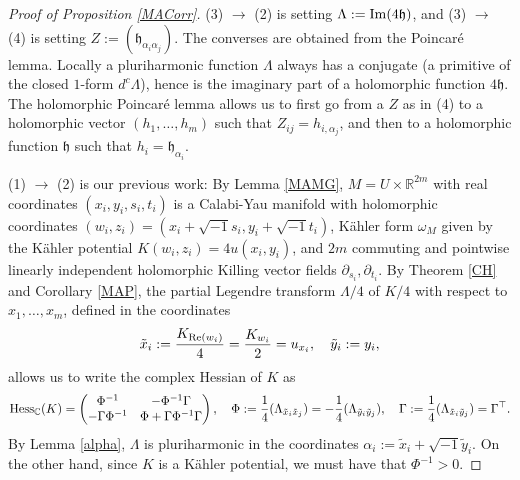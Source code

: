 \documentclass[11pt,reqno]{amsart}
\newcommand{\C}{\mathbb{C}}
\newcommand{\R}{\mathbb{R}}
\theoremstyle{plain}
\theoremstyle{definition}
\numberwithin{equation}{section}
\begin{document}
\begin{proof}[Proof of Proposition \ref{MACorr}]
    (3) $\longrightarrow$ (2) is setting $\Lambda := {\rm Im}(4\mathfrak{h})$, and (3) $\longrightarrow$ (4) is setting $Z := (\mathfrak{h}_{\alpha_i \alpha_j})$. The converses are obtained from the Poincaré lemma. Locally a pluriharmonic function $\Lambda$ always has a conjugate (a primitive of the closed $1$-form $d^c\Lambda$), hence is the imaginary part of a holomorphic function $4\mathfrak{h}$. The holomorphic Poincaré lemma allows us to first go from a $Z$ as in (4) to a holomorphic vector $(h_1,\ldots, h_m)$ such that $Z_{ij} = h_{i,\alpha_j}$, and then to a holomorphic function $\mathfrak{h}$ such that $h_i = \mathfrak{h}_{\alpha_i}$. 

    (1) $\longrightarrow$ (2) is our previous work: By Lemma \ref{MAMG}, $M=U\times \R^{2m}$ with real coordinates $(x_{i},y_{i},s_{i},t_{i})$ is a Calabi-Yau manifold with holomorphic coordinates $(w_{i},z_{i})=(x_{i}+\sqrt{-1}s_{i},y_{i}+\sqrt{-1}t_{i})$, Kähler form $\omega_M$ given by the Kähler potential $K(w_{i},z_{i})=4u(x_{i},y_{i})$, and $2m$ commuting and pointwise linearly independent holomorphic Killing vector fields $\partial_{s_i}, \partial_{t_i}$. By Theorem \ref{CH} and Corollary \ref{MAP}, the partial Legendre transform $\Lambda/4$ of $K/4$ with respect to $x_1,\ldots,x_m$, defined in the coordinates
$$\tilde{x}_{i}:=\frac{K_{{\rm Re}(w_i)}}{4} = \frac{K_{w_{i}}}{2}=u_{x_{i}} ,\quad  \tilde{y}_{i}:=y_{i},$$
allows us to write the complex Hessian of $K$ as
$${\rm Hess}_{\C}(K)=\begin{pmatrix}
    \Phi^{-1} & -\Phi^{-1}\Gamma  \\
     -\Gamma\Phi^{-1}  & \Phi+\Gamma \Phi^{-1}\Gamma 
\end{pmatrix}, \quad \Phi:=\frac{1}{4}(\Lambda_{\tilde{x}_{i}\tilde{x}_{j}}) = -\frac{1}{4}(\Lambda_{\tilde{y}_{i}\tilde{y}_{j}}),\quad  \Gamma:=\frac{1}{4}(\Lambda_{\tilde{x}_{i}\tilde{y}_{j}})=\Gamma^\top.$$
By Lemma \ref{alpha}, $\Lambda$ is pluriharmonic in the coordinates $\alpha_{i}:=\tilde{x}_{i}+\sqrt{-1}\tilde{y}_{i}$. On the other hand, since $K$ is a Kähler potential, we must have that $\Phi^{-1}>0$.


\end{proof}
\end{document}
